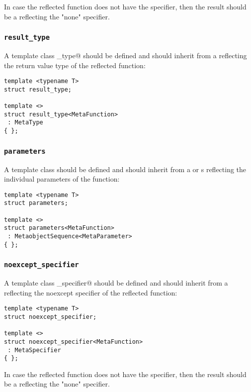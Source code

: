 In case the reflected function does not have the \verb@constexpr@ specifier,
then the result should be a  reflecting the "none" specifier.

\subsubsection{\texttt{result\_type}}

A template class \verb@result_type@ should be defined and should inherit from
a  reflecting the return value type of the reflected function:

\begin{verbatim}
template <typename T>
struct result_type;

template <>
struct result_type<MetaFunction>
 : MetaType
{ };
\end{verbatim}

\subsubsection{\texttt{parameters}}

A template class \verb@parameters@ should be defined and should inherit from
a  or s reflecting the individual parameters
of the function:

\begin{verbatim}
template <typename T>
struct parameters;

template <>
struct parameters<MetaFunction>
 : MetaobjectSequence<MetaParameter>
{ };
\end{verbatim}

\subsubsection{\texttt{noexcept\_specifier}}

A template class \verb@noexcept_specifier@ should be defined and should inherit from
a  reflecting the noexcept specifier of the reflected function:

\begin{verbatim}
template <typename T>
struct noexcept_specifier;

template <>
struct noexcept_specifier<MetaFunction>
 : MetaSpecifier
{ };
\end{verbatim}

In case the reflected function does not have the \verb@noexcept@ specifier,
then the result should be a  reflecting the "none" specifier.


